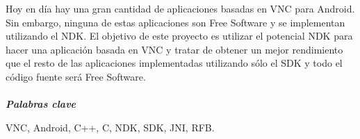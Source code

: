 
Hoy en día hay una gran cantidad de aplicaciones basadas en VNC para Android. Sin embargo, ninguna de estas aplicaciones son Free Software y se implementan utilizando el NDK. El objetivo de este proyecto es utilizar el potencial NDK para hacer una aplicación basada en VNC y tratar de obtener un mejor rendimiento que el resto de las aplicaciones implementadas utilizando sólo el SDK y todo el código fuente será Free Software.
\\ \mbox{ } \\
\textit{\textbf{Palabras clave}}

VNC, Android, C++, C, NDK, SDK, JNI, RFB.
